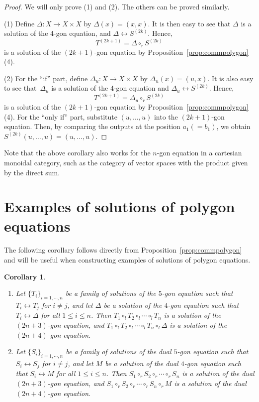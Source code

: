\documentclass[pdftex]{sigma}
\numberwithin{equation}{section}
\newtheorem{Corollary}[Theorem]{Corollary}
\theoremstyle{definition}
\begin{document}
\begin{proof}
 We will only prove (1) and (2). The others can be proved similarly.

 (1) Define $\Delta\colon X\to X\times X$ by $\Delta(x) = (x, x)$. It is then easy to see that $\Delta$ is a solution of the 4-gon equation, and $\Delta \leftrightarrow S^{(2k)}$. Hence, \[
 T^{(2k+1)}=\Delta \circ_r S^{(2k)}
 \] is a solution of the $(2k+1)$-gon equation by Proposition~\ref{prop:commpolygon}\,(4).

 (2) For the ``if'' part, define $\Delta_u\colon X\to X\times X$ by $\Delta_u(x) = (u, x)$. It is also easy to see that~$\Delta_u$ is a solution of the 4-gon equation and $\Delta_u \leftrightarrow S^{(2k)}$. Hence, \[
 T^{(2k+1)}=\Delta_u \circ_r S^{(2k)}
 \] is a solution of the $(2k+1)$-gon equation by Proposition~\ref{prop:commpolygon}\,(4). For the ``only if'' part, substitute $(u,\dots,u)$ into the $(2k+1)$-gon equation. Then, by comparing the outputs at the position $a_1(=b_1)$, we obtain $S^{(2k)}(u,\dots, u)=(u,\dots,u)$.
\end{proof}

Note that the above corollary also works for the $n$-gon equation in a cartesian monoidal category, such as the category of vector spaces with the product given by the direct sum.

\section{Examples of solutions of polygon equations}\label{sec:examples_polygon_eq}

The following corollary follows directly from Proposition~\ref{prop:commpolygon} and will be useful when constructing examples of solutions of polygon equations.

\begin{Corollary}\label{cor:comm}\quad
 \begin{enumerate}\itemsep=0pt
 \item[$(1)$] Let $\{ T_i \}_{i=1,\cdots,n}$ be a family of solutions of the $5$-gon equation such that $T_i\leftrightarrow T_j$ for $i\neq j$, and let $\Delta$ be a solution of the $4$-gon equation such that $T_i\leftrightarrow\Delta$ for all $1\leq i \leq n$. Then $T_1 \circ_l T_2 \circ_l \cdots \circ_l T_n$ is a solution of the $(2n+3)$-gon equation, and $T_1 \circ_l T_2 \circ_l \cdots \circ_l T_n \circ_l \Delta$ is a solution of the $(2n+4)$-gon equation.
 \item[$(2)$] Let $\{ S_i \}_{i=1,\cdots,n}$ be a family of solutions of the dual $5$-gon equation such that $S_i\leftrightarrow S_j$ for $i\neq j$, and let $M$ be a solution of the dual $4$-gon equation such that $S_i\leftrightarrow M$ for all $1\leq i \leq n$. Then $S_1 \circ_r S_2 \circ_r \cdots \circ_r S_n$ is a solution of the dual $(2n+3)$-gon equation, and $S_1 \circ_r S_2 \circ_r \cdots \circ_r S_n \circ_r M$ is a solution of the dual $(2n+4)$-gon equation.
 \end{enumerate}
\end{Corollary}
\end{document}
